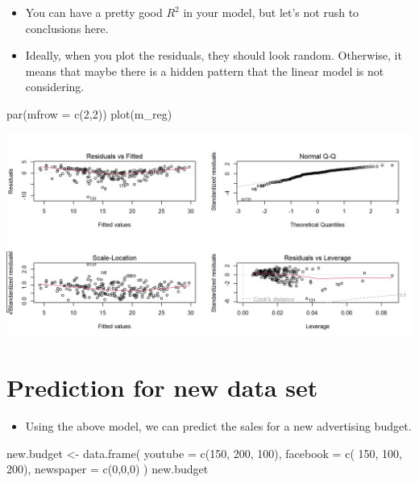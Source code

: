 \documentclass[
]{book}
\newenvironment{Shaded}{\begin{snugshade}}{\end{snugshade}}
\newcommand{\AttributeTok}[1]{\textcolor[rgb]{0.77,0.63,0.00}{#1}}
\newcommand{\DecValTok}[1]{\textcolor[rgb]{0.00,0.00,0.81}{#1}}
\newcommand{\FunctionTok}[1]{\textcolor[rgb]{0.00,0.00,0.00}{#1}}
\newcommand{\NormalTok}[1]{#1}
\newcommand{\OtherTok}[1]{\textcolor[rgb]{0.56,0.35,0.01}{#1}}
\providecommand{\tightlist}{%
  \setlength{\itemsep}{0pt}\setlength{\parskip}{0pt}}
\begin{document}
\begin{itemize}
\item
  You can have a pretty good \(R^2\) in your model, but let's not rush to conclusions here.
\item
  Ideally, when you plot the residuals, they should look random. Otherwise, it means that maybe there is a hidden pattern that the linear model is not considering.
\end{itemize}

\begin{Shaded}
\begin{Highlighting}[]
\FunctionTok{par}\NormalTok{(}\AttributeTok{mfrow =} \FunctionTok{c}\NormalTok{(}\DecValTok{2}\NormalTok{,}\DecValTok{2}\NormalTok{))}
\FunctionTok{plot}\NormalTok{(m\_reg)}
\end{Highlighting}
\end{Shaded}

\begin{center}\includegraphics{figure/unnamed-chunk-31-1} \end{center}

\hypertarget{prediction-for-new-data-set}{%
\section{Prediction for new data set}\label{prediction-for-new-data-set}}

\begin{itemize}
\tightlist
\item
  Using the above model, we can predict the sales for a new advertising budget.
\end{itemize}

\begin{Shaded}
\begin{Highlighting}[]
\NormalTok{new.budget }\OtherTok{\textless{}{-}} \FunctionTok{data.frame}\NormalTok{(}
  \AttributeTok{youtube =} \FunctionTok{c}\NormalTok{(}\DecValTok{150}\NormalTok{, }\DecValTok{200}\NormalTok{, }\DecValTok{100}\NormalTok{),}
  \AttributeTok{facebook =} \FunctionTok{c}\NormalTok{( }\DecValTok{150}\NormalTok{, }\DecValTok{100}\NormalTok{, }\DecValTok{200}\NormalTok{),}
  \AttributeTok{newspaper =} \FunctionTok{c}\NormalTok{(}\DecValTok{0}\NormalTok{,}\DecValTok{0}\NormalTok{,}\DecValTok{0}\NormalTok{)}
\NormalTok{)}
\NormalTok{new.budget}
\end{Highlighting}
\end{Shaded}
\end{document}
